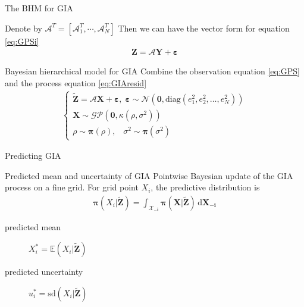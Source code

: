 \documentclass{beamer}
\newcommand{\ud}{\,\mathrm{d}}
\begin{document}
\begin{frame}{The BHM for GIA}

Denote by $\bm{\mathcal{A}}^T = \left[
 \bm{\mathcal{A}}_1^T, \cdots,\bm{\mathcal{A}}_N^T \right]$
Then we can have the vector form for equation \ref{eq:GPSi}
\begin{align}\label{eq:GPS}
\bm{Z} = \bm{\mathcal{A}}\bm{Y} + \bm{\varepsilon} 
\end{align}
\begin{block}{Bayesian hierarchical model for GIA}
Combine the observation equation \ref{eq:GPS} and the process equation \ref{eq:GIAresid}
\begin{align}\label{eq:BHM}
\left\{ \begin{array}{l}
\bm{\tilde{Z}} = \bm{\mathcal{A}}\bm{X} + \bm{\varepsilon}, \; 
\bm{\varepsilon} \sim \mathcal{N} (\bm{0}, \mbox{diag}(e_1^2, e_2^2, \dots, e_N^2)) \\
\bm{X} \sim \mathcal{GP}(\bm{0}, \kappa(\rho, \sigma^2)) \\
\rho \sim \bm{\pi}(\rho), \;\;\; \sigma^2 \sim \bm{\pi}(\sigma^2)
\end{array} \right.
\end{align}
\end{block}

\end{frame}

\begin{frame}{Predicting GIA}
\begin{block}{Predicted mean and uncertainty of GIA}
Pointwise Bayesian update of the GIA process on a fine grid. For grid point $X_i$, the predictive distribution is
\begin{align}
\bm{\pi}(X_i | \bm{\tilde{Z}}) = \int_{\bm{\mathcal{X}_{-i}}} \bm{\pi}(\bm{X} | \bm{\tilde{Z}}) \ud \bm{X_{-i}}
\end{align}
\begin{description}
\item[predicted mean] $X_i^* = \mathbb{E}(X_i| \bm{\tilde{Z}})$
\item[predicted uncertainty] $u_i^* = \mbox{sd}(X_i| \bm{\tilde{Z}})$
\end{description}

\end{block}
\end{frame}

\end{document}

